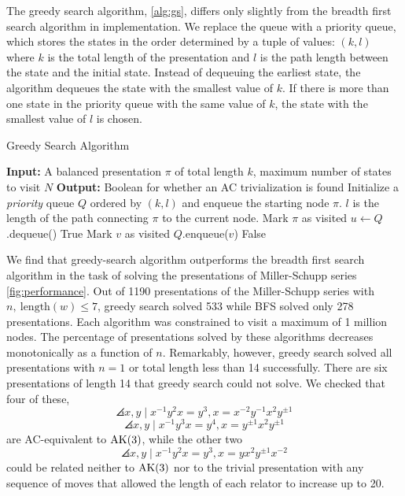 The greedy search algorithm, \autoref{alg:gs}, differs only slightly from the breadth first search algorithm in implementation. We replace the queue with a priority queue, which stores the states in the order determined by a tuple of values: $(k, l)$ where $k$ is the total length of the presentation and $l$ is the path length between the state and the initial state. Instead of dequeuing the earliest state, the algorithm dequeues the state with the smallest value of $k$. If there is more than one state in the priority queue with the same value of $k$, the state with the smallest value of $l$ is chosen. 
\newline 

\begin{algorithm}
\caption{Greedy Search Algorithm}\label{alg:gs}
\begin{algorithmic}[1] %
\State \textbf{Input:} A balanced presentation $\pi$ of total length $k$, maximum number of states to visit $N$
\State \textbf{Output:} Boolean for whether an AC trivialization is found
\State Initialize a \textit{priority} queue $Q$ ordered by $(k, l)$ and enqueue the starting node $\pi$. $l$ is the length of the path connecting $\pi$ to the current node.
\State Mark $\pi$ as visited
    \State $u \gets Q$.dequeue() 
            \State \Return True 
        \EndIf
            \State Mark $v$ as visited
            \State $Q$.enqueue($v$) 
        \EndIf
    \EndFor
\EndWhile
\State \Return False 
\end{algorithmic}
\end{algorithm}

We find that greedy-search algorithm outperforms the breadth first search algorithm in the task of solving the presentations of Miller-Schupp series \autoref{fig:performance}. Out of 1190 presentations of the Miller-Schupp series with $n, \ \text{length}(w) \leq 7$, greedy search solved 533 while BFS solved only 278 presentations. Each algorithm was constrained to visit a maximum of 1 million nodes. The percentage of presentations solved by these algorithms decreases monotonically as a function of $n$. Remarkably, however, greedy search solved all presentations with $n=1$ or total length less than 14 successfully. There are six presentations of length 14 that greedy search could not solve. We checked that four of these,
\[
\angles{x, y \mid x^{-1} y^2 x = y^{3} , x = x^{-2} y^{-1} x^2 y^{\pm 1}}
\]
\[
\angles{x, y \mid x^{-1} y^3 x = y^{4} , x = y^{\pm 1} x^2 y^{\pm 1}}
\]
are AC-equivalent to $\text{AK}(3)$, while the other two
\[
\angles{x, y \mid x^{-1} y^2 x = y^{3} , x = y x^2 y^{\pm 1} x^{-2}}
\]
could be related neither to $\text{AK}(3)$ nor to the trivial presentation with any sequence of moves that allowed the length of each relator to increase up to 20. 
\newline 

